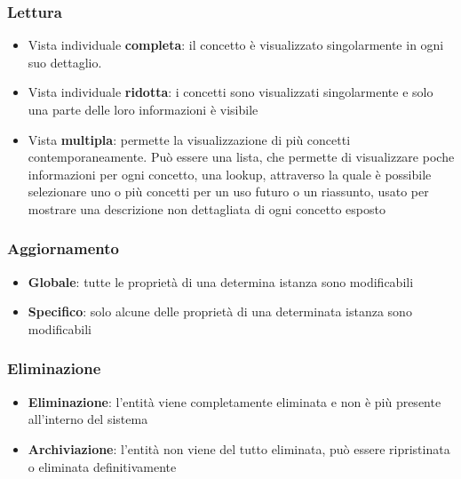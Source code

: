 \documentclass[12pt,italian,]{report}
\providecommand{\tightlist}{%
  \setlength{\itemsep}{0pt}\setlength{\parskip}{0pt}}
\begin{document}
\hypertarget{lettura}{%
\subsubsection{Lettura}\label{lettura}}

\begin{itemize}
\tightlist
\item
  Vista individuale \textbf{completa}: il concetto è visualizzato
  singolarmente in ogni suo dettaglio.
\item
  Vista individuale \textbf{ridotta}: i concetti sono visualizzati
  singolarmente e solo una parte delle loro informazioni è visibile
\item
  Vista \textbf{multipla}: permette la visualizzazione di più concetti
  contemporaneamente. Può essere una lista, che permette di visualizzare
  poche informazioni per ogni concetto, una lookup, attraverso la quale
  è possibile selezionare uno o più concetti per un uso futuro o un
  riassunto, usato per mostrare una descrizione non dettagliata di ogni
  concetto esposto
\end{itemize}

\hypertarget{aggiornamento}{%
\subsubsection{Aggiornamento}\label{aggiornamento}}

\begin{itemize}
\tightlist
\item
  \textbf{Globale}: tutte le proprietà di una determina istanza sono
  modificabili
\item
  \textbf{Specifico}: solo alcune delle proprietà di una determinata
  istanza sono modificabili
\end{itemize}

\hypertarget{eliminazione}{%
\subsubsection{Eliminazione}\label{eliminazione}}

\begin{itemize}
\tightlist
\item
  \textbf{Eliminazione}: l'entità viene completamente eliminata e non è
  più presente all'interno del sistema
\item
  \textbf{Archiviazione}: l'entità non viene del tutto eliminata, può
  essere ripristinata o eliminata definitivamente
\end{itemize}
\end{document}
